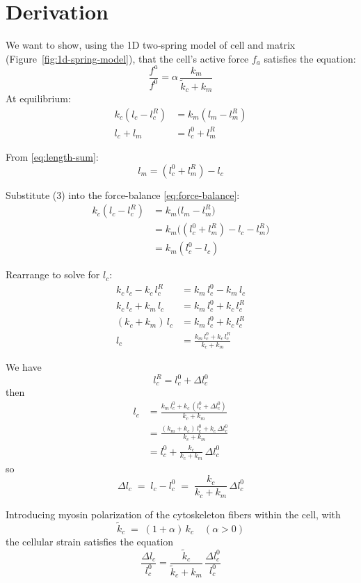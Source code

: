 \documentclass[a4paper,margin=1in]{article}
\begin{document}
\section*{Derivation}

We want to show, using the 1D two‐spring model of cell and matrix (Figure~\ref{fig:1d-spring-model}),
that the cell’s active force \(f_a\) satisfies the equation:
\[
\frac{f^{a}}{f^{0}} = \alpha \,\frac{k_{m}}{\tilde{k}_{c} + k_{m}}
\]
At equilibrium:
\begin{align}
  k_c (l_c - l_c^R) &= k_m (l_m - l_m^R)  \label{eq:force-balance}\\
  l_c + l_m         &= l_c^0 + l_m^R      \label{eq:length-sum}
\end{align}

From \eqref{eq:length-sum}:
\begin{equation} \label{eq:lm}
  l_m = (l_c^0 + l_m^R) - l_c
\end{equation}

Substitute (3) into the force-balance \eqref{eq:force-balance}:
\begin{align*}
  k_c (l_c - l_c^R)
  &= k_m \bigl(l_m - l_m^R\bigr) \nonumber\\
  &= k_m\bigl((l_c^0 + l_m^R) - l_c - l_m^R\bigr)\nonumber\\
  &= k_m (l_c^0 - l_c)
\end{align*}

Rearrange to solve for \(l_c\):
\begin{align*}
  k_c\,l_c - k_c\,l_c^R       &= k_m\,l_c^0 - k_m\,l_c \nonumber\\
  k_c\,l_c + k_m\,l_c         &= k_m\,l_c^0 + k_c\,l_c^R \nonumber\\
  (k_c + k_m)\,l_c            &= k_m\,l_c^0 + k_c\,l_c^R \nonumber\\
  l_c                         &= \frac{k_m\,l_c^0 + k_c\,l_c^R}{k_c + k_m}
\end{align*}

We have
\[
  l_c^R = l_c^0 + \Delta l_c^0
\]
then
\begin{align*}
  l_c
  &= \frac{k_m\,l_c^0 + k_c\,(l_c^0 + \Delta l_c^0)}{k_c + k_m}\\
  &= \frac{(k_m + k_c)\,l_c^0 + k_c\,\Delta l_c^0}{k_c + k_m}\\
  &= l_c^0 + \frac{k_c}{k_c + k_m}\,\Delta l_c^0
\end{align*}
so
\[
  \Delta l_c \;=\; l_c - l_c^0 \;=\; \frac{k_c}{k_c + k_m}\,\Delta l_c^0
\]

Introducing myosin polarization of the cytoskeleton fibers within the cell,  with 
\[
  \tilde{k}_c \;=\; (1 + \alpha)\,k_c \quad (\alpha>0)
\]
the cellular strain satisfies the equation
\[
  \frac{\Delta l_c}{l_c^0}
  = \frac{\tilde{k}_c}{\tilde{k}_c + k_m}\,\frac{\Delta l_c^0}{l_c^0}
\]
\end{document}
